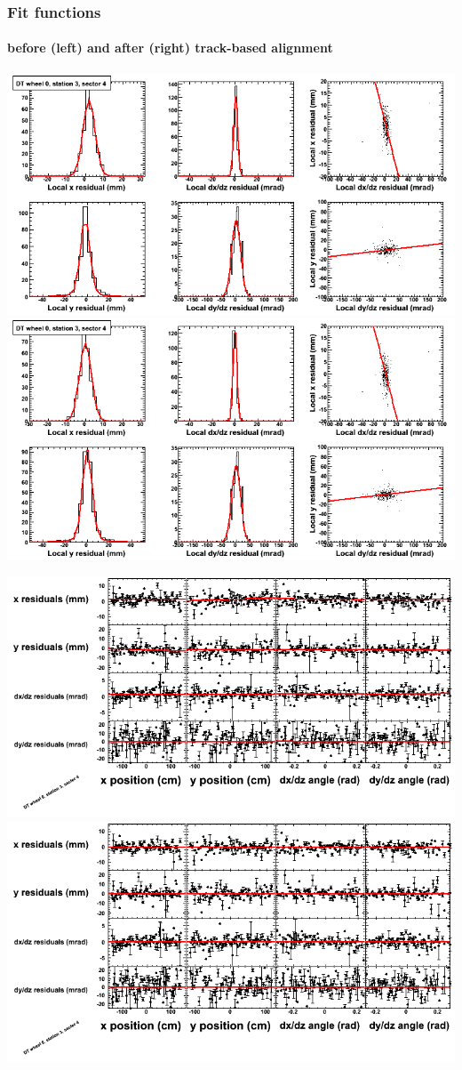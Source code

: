 \documentclass[compress]{beamer}
\begin{document}
\begin{frame}
\frametitle{Fit functions}
\framesubtitle{before (left) and after (right) track-based alignment}
\includegraphics[width=0.5\linewidth]{fitfunctions_re01/MBwhCst3sec04_bellcurves.png} \includegraphics[width=0.5\linewidth]{fitfunctions_re05/MBwhCst3sec04_bellcurves.png}

\includegraphics[width=0.5\linewidth]{fitfunctions_re01/MBwhCst3sec04_polynomials.png} \includegraphics[width=0.5\linewidth]{fitfunctions_re05/MBwhCst3sec04_polynomials.png}
\end{frame}
\end{document}
